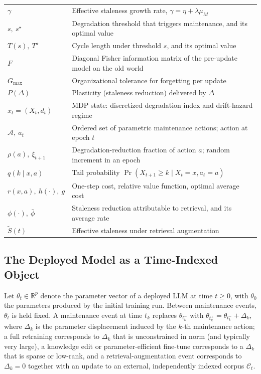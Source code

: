 \documentclass[electronics,article,submit,pdftex,moreauthors]{Definitions/mdpi}
\newcommand{\D}{\varDelta}                 %
\newcommand{\phibar}{\bar{\phi}}
\newcommand{\Gmax}{G_{\max}}
\newcommand{\tkm}{t_k^{-}}
\newcommand{\tkp}{t_k^{+}}
\newcommand{\calA}{\mathcal{A}}
\newcommand{\calC}{\mathcal{C}}
\begin{document}
\begin{table}[H]
\begin{tabularx}{\textwidth}{lL}
$\gamma$ & Effective staleness growth rate, $\gamma=\eta+\lambda\mu_M$\\
$s,\ s^\star$ & Degradation threshold that triggers maintenance, and its optimal value\\
$T(s),\ T^\star$ & Cycle length under threshold $s$, and its optimal value\\
$F$ & Diagonal Fisher information matrix of the pre-update model on the old world\\
$\Gmax$ & Organizational tolerance for forgetting per update\\
$P(\D)$ & Plasticity (staleness reduction) delivered by $\D$\\
$x_t=(X_t,d_t)$ & MDP state: discretized degradation index and drift-hazard regime\\
$\calA,\ a_t$ & Ordered set of parametric maintenance actions; action at epoch $t$\\
$\rho(a),\ \xi_{t+1}$ & Degradation-reduction fraction of action $a$; random increment in an epoch\\
$q(k\mid x,a)$ & Tail probability $\Pr(X_{t+1}\ge k\mid X_t=x,a_t=a)$\\
$r(x,a),\ h(\cdot),\ g$ & One-step cost, relative value function, optimal average cost\\
$\phi(\cdot),\ \phibar$ & Staleness reduction attributable to retrieval, and its average rate\\
$\tilde{S}(t)$ & Effective staleness under retrieval augmentation\\
\bottomrule
\end{tabularx}
\end{table}

\subsection{The Deployed Model as a Time-Indexed Object}

Let $\theta_t\in\mathbb{R}^p$ denote the parameter vector of a deployed LLM at time $t\ge 0$, with $\theta_0$ the parameters produced by the initial training run. Between maintenance events, $\theta_t$ is held fixed. A maintenance event at time $t_k$ replaces $\theta_{\tkm}$ with $\theta_{\tkp}=\theta_{\tkm}+\D_k$, where $\D_k$ is the parameter displacement induced by the $k$-th maintenance action; a full retraining corresponds to $\D_k$ that is unconstrained in norm (and typically very large), a knowledge edit or parameter-efficient fine-tune corresponds to a $\D_k$ that is sparse or low-rank, and a retrieval-augmentation event corresponds to $\D_k=0$ together with an update to an external, independently indexed corpus $\calC_t$.
\end{document}

